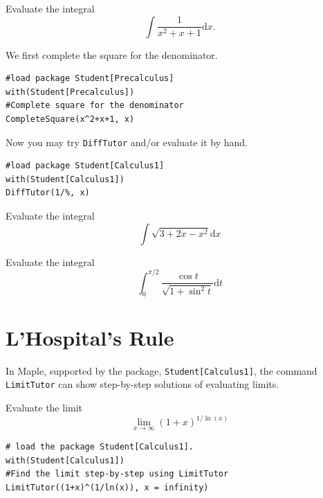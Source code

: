 \documentclass[]{book}
\theoremstyle{definition}
\theoremstyle{definition}
\theoremstyle{definition}
\theoremstyle{remark}
\let\BeginKnitrBlock\begin \let\EndKnitrBlock\end
\begin{document}
\BeginKnitrBlock{example}
\protect\hypertarget{exm:unnamed-chunk-5}{}{\label{exm:unnamed-chunk-5} }
Evaluate the integral
\[
\int\dfrac{1}{x^2+x+1} \mathrm{d} x.
\]
\EndKnitrBlock{example}

\BeginKnitrBlock{solution}
{}

We first complete the square for the denominator.

\begin{verbatim}
#load package Student[Precalculus]
with(Student[Precalculus])
#Complete square for the denominator
CompleteSquare(x^2+x+1, x)
\end{verbatim}

Now you may try \texttt{DiffTutor} and/or evaluate it by hand.

\begin{verbatim}
#load package Student[Calculus1]
with(Student[Calculus1])
DiffTutor(1/%, x)
\end{verbatim}
\EndKnitrBlock{solution}

\BeginKnitrBlock{exercise}
\protect\hypertarget{exr:unnamed-chunk-7}{}{\label{exr:unnamed-chunk-7} }
Evaluate the integral
\[
\int \sqrt{3+2 x-x^{2}} \mathrm{d} x
\]
\EndKnitrBlock{exercise}

\BeginKnitrBlock{exercise}
\protect\hypertarget{exr:unnamed-chunk-8}{}{\label{exr:unnamed-chunk-8} }
Evaluate the integral
\[
\int_{0}^{\pi / 2} \frac{\cos t}{\sqrt{1+\sin ^{2} t}} \mathrm{d} t
\]
\EndKnitrBlock{exercise}

\hypertarget{lhospitals-rule}{%
\chapter{L'Hospital's Rule}\label{lhospitals-rule}}

In Maple, supported by the package, \texttt{Student{[}Calculus1{]}}, the command \texttt{LimitTutor} can show step-by-step solutions of evaluating limits.

\BeginKnitrBlock{example}
\protect\hypertarget{exm:unnamed-chunk-1}{}{\label{exm:unnamed-chunk-1} }
Evaluate the limit
\[
\lim\limits_{x\to \infty}(1+x)^{1/\ln(x)}
\]
\EndKnitrBlock{example}

\BeginKnitrBlock{solution}
{}

\begin{verbatim}
# load the package Student[Calculus1].
with(Student[Calculus1])
#Find the limit step-by-step using LimitTutor
LimitTutor((1+x)^(1/ln(x)), x = infinity)
\end{verbatim}
\EndKnitrBlock{solution}
\end{document}
